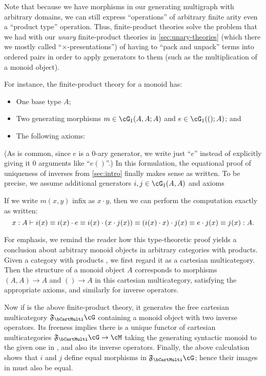 Note that because we have morphisms in our generating multigraph with arbitrary domains, we can still express ``operations'' of arbitrary finite arity even a ``product type'' operation.
Thus, finite-product theories solve the problem that we had with our \emph{unary} finite-product theories in \cref{sec:unary-theories} (which there we mostly called ``$\times$-presentations'') of having to ``pack and unpack'' terms into ordered pairs in order to apply generators to them (such as the multiplication of a monoid object).

For instance, the finite-product theory for a monoid has:
\begin{itemize}
\item One base type $A$;
\item Two generating morphisms $m\in\cG_1(A,A;A)$ and $e\in \cG_1(();A)$; and
\item The following axioms:
\end{itemize}
(As is common, since $e$ is a 0-ary generator, we write just ``$e$'' instead of explicitly giving it 0 arguments like ``$e()$''.)
In this formulation, the equational proof of uniqueness of inverses from \cref{sec:intro} finally makes sense as written.
To be precise, we assume additional generators $i,j\in \cG_1(A,A)$ and axioms
If we write $m(x,y)$ infix as $x\cdot y$, then we can perform the computation exactly as written:
\[ x:A \vdash i(x) \equiv i(x) \cdot e \equiv i(x) \cdot (x \cdot j(x)) \equiv (i(x)\cdot x)\cdot j(x) \equiv e\cdot j(x) \equiv j(x) : A.\]

For emphasis, we remind the reader how this type-theoretic proof yields a conclusion about arbitrary monoid objects in arbitrary categories with products.
Given a category with products \cM, we first regard it as a cartesian multicategory.
Then the structure of a monoid object $A$ corresponds to morphisms $(A,A)\to A$ and $()\to A$ in this cartesian multicategory, satisfying the appropriate axioms, and similarly for inverse operators.

Now if \cG is the above finite-product theory, it generates the free cartesian multicategory $\F\bCartMulti\cG$ containing a monoid object with two inverse operators.
Its freeness implies there is a unique functor of cartesian multicategories $\F\bCartMulti\cG\to \cM$ taking the generating syntactic monoid to the given one in \cM, and also its inverse operators.
Finally, the above calculation shows that $i$ and $j$ define equal morphisms in $\F\bCartMulti\cG$; hence their images in \cM must also be equal.

